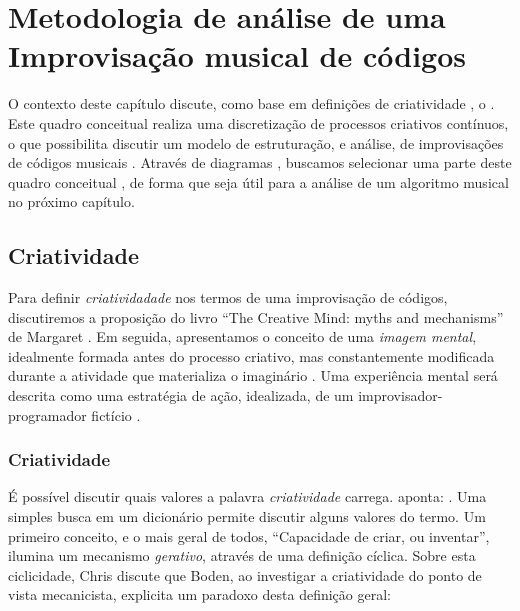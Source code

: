 \chapter{Metodologia de análise de uma Improvisação musical de códigos}\label{cap:metodologia}

O contexto deste capítulo discute, como base em definições de criatividade , o  . Este quadro conceitual realiza uma discretização de processos criativos contínuos, o que possibilita discutir um modelo de estruturação, e análise, de improvisações de códigos musicais . Através de diagramas , buscamos selecionar uma parte deste quadro conceitual , de forma que seja útil para a análise de um algoritmo musical no próximo capítulo.

\section{Criatividade}\label{sec:criatividade}

Para  definir \emph{criatividadade} nos termos de uma improvisação de códigos, discutiremos a proposição do livro ``The Creative Mind: myths and mechanisms'' de Margaret   . Em seguida, apresentamos o conceito de uma \emph{imagem mental}, idealmente formada antes do processo criativo, mas constantemente modificada durante a atividade que materializa o imaginário . Uma experiência mental será descrita como uma estratégia de ação, idealizada, de um improvisador-programador fictício . 

\subsection{Criatividade}\label{sec:diferencas}

É possível discutir quais valores a palavra \emph{criatividade} carrega.  aponta: . Uma simples busca em um dicionário  permite discutir alguns valores do termo. Um primeiro conceito, e o mais geral de todos, ``Capacidade de criar, ou inventar'', ilumina um mecanismo \emph{gerativo}, através de uma definição cíclica. Sobre esta ciclicidade, Chris  discute que Boden, ao investigar a criatividade do ponto de vista mecanicista, explicita um paradoxo desta definição geral:

